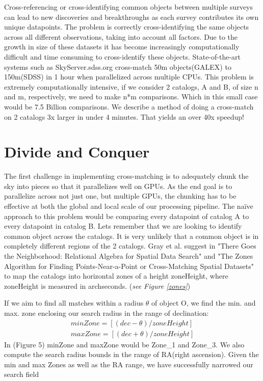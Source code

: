 Cross-referencing or cross-identifying common objects between multiple surveys can lead to new discoveries and breakthroughs as each survey contributes its own unique datapoints. The problem is correctly cross-identifying the same objects across all different observations, taking into account all factors. Due to the growth in size of these datasets it has become increasingly computationally difficult and time consuming to cross-identify these objects. State-of-the-art systems such as SkyServer.sdss.org cross-match 50m objects(GALEX) to 150m(SDSS) in 1 hour when parallelized across multiple CPUs. This problem is extremely computationally intensive, if we consider 2 catalogs, A and B, of size n and m, respectively, we need to make n*m comparisons. Which in this small case would be 7.5 Billion comparisons. We describe a method of doing a cross-match on 2 catalogs 3x larger in under 4 minutes. That yields an over 40x speedup!

\section{Divide and Conquer}
The first challenge in implementing cross-matching is to adequately chunk the sky into pieces so that it parallelizes well on GPUs. As the end goal is to parallelize across not just one, but multiple GPUs, the chunking has to be effective at both the global and local scale of our processing pipeline. The na\"{i}ve approach to this problem would be comparing every datapoint of catalog A to every datapoint in catalog B. Lets remember that we are looking to identify common object across the catalogs. It is very unlikely that a common object is in completely different regions of the 2 catalogs. Gray et al. suggest in "There Goes the Neighborhood: Relational Algebra for Spatial Data Search" \citet{gray2004there} and "The Zones Algorithm for Finding Points-Near-a-Point or Cross-Matching Spatial Datasets" \citet{gray2007zones} to map the catalogs into horizontal zones of a height zoneHeight, where zoneHeight is measured in archseconds. (\textit{see Figure \ref{zones}})

If we aim to find all matches within a radius $\theta$ of object O, we find the min. and max. zone enclosing our search radius in the range of declination:
\begin{eqnarray}
minZone = [(dec - \theta) / zoneHeight]\nonumber\\
maxZone = [(dec + \theta) / zoneHeight]
\end{eqnarray}
In (Figure 5) minZone and maxZone would be Zone\_1 and Zone\_3. We also compute the search radius bounds in the range of RA(right ascension). Given the min and max Zones as well as the RA range, we have successfully narrowed our search field

